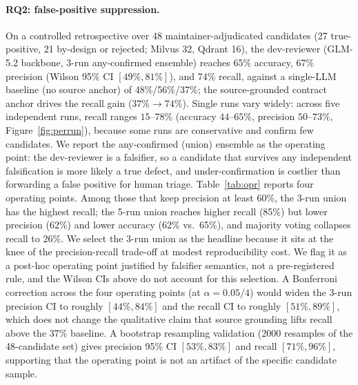 \documentclass[sigconf]{acmart}
\begin{document}
\paragraph{RQ2: false-positive suppression.}
On a controlled retrospective over 48 maintainer-adjudicated candidates (27 true-positive, 21 by-design or rejected; Milvus 32, Qdrant 16), the dev-reviewer (GLM-5.2 backbone, 3-run any-confirmed ensemble) reaches 65\% accuracy, 67\% precision (Wilson 95\% CI $[49\%, 81\%]$), and 74\% recall, against a single-LLM baseline (no source anchor) of 48\%/56\%/37\%; the source-grounded contract anchor drives the recall gain ($37\%\to74\%$). Single runs vary widely: across five independent runs, recall ranges $15$--$78\%$ (accuracy $44$--$65\%$, precision $50$--$73\%$, Figure~\ref{fig:perrun}), because some runs are conservative and confirm few candidates. We report the any-confirmed (union) ensemble as the operating point: the dev-reviewer is a falsifier, so a candidate that survives any independent falsification is more likely a true defect, and under-confirmation is costlier than forwarding a false positive for human triage. Table~\ref{tab:opr} reports four operating points. Among those that keep precision at least 60\%, the 3-run union has the highest recall; the 5-run union reaches higher recall (85\%) but lower precision (62\%) and lower accuracy (62\% vs.\ 65\%), and majority voting collapses recall to 26\%. We select the 3-run union as the headline because it sits at the knee of the precision-recall trade-off at modest reproducibility cost. We flag it as a post-hoc operating point justified by falsifier semantics, not a pre-registered rule, and the Wilson CIs above do not account for this selection. A Bonferroni correction across the four operating points (at $\alpha=0.05/4$) would widen the 3-run precision CI to roughly $[44\%, 84\%]$ and the recall CI to roughly $[51\%, 89\%]$, which does not change the qualitative claim that source grounding lifts recall above the 37\% baseline. A bootstrap resampling validation (2000 resamples of the 48-candidate set) gives precision 95\% CI $[53\%, 83\%]$ and recall $[71\%, 96\%]$, supporting that the operating point is not an artifact of the specific candidate sample.
\end{document}
